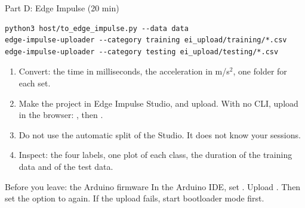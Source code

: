 \begin{frame}[fragile]{Part D: Edge Impulse (20 min)}
  \small
\begin{lstlisting}[style=shell]
python3 host/to_edge_impulse.py --data data
edge-impulse-uploader --category training ei_upload/training/*.csv
edge-impulse-uploader --category testing ei_upload/testing/*.csv
\end{lstlisting}
  \begin{enumerate}
    \item Convert: the time in milliseconds, the acceleration in m/s$^2$,
          one folder for each set.
    \item Make the project  in Edge Impulse Studio, and
          upload. With no CLI, upload in the browser: , then .
    \item Do not use the automatic split of the Studio. It does not know
          your sessions.
    \item Inspect: the four labels, one plot of each class, the duration
          of the training data and of the test data.
  \end{enumerate}
  \begin{block}{Before you leave: the Arduino firmware}
    In the Arduino IDE, set . Upload .
    Then set the option to  again. If the upload fails,
    start bootloader mode first.
  \end{block}
\end{frame}
